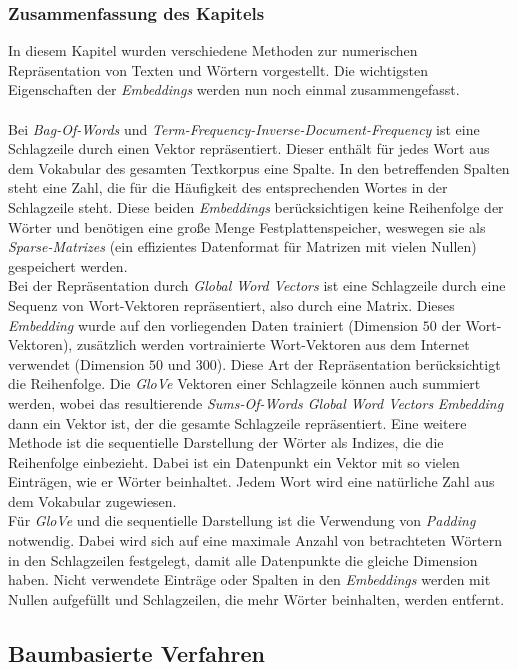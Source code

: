 \documentclass[a4paper,11pt]{article}
\begin{document}
\subsubsection{Zusammenfassung des Kapitels}

In diesem Kapitel wurden verschiedene Methoden zur numerischen Repräsentation von Texten und Wörtern vorgestellt. Die wichtigsten Eigenschaften der \textit{Embeddings} werden nun noch einmal zusammengefasst.\\
\\
Bei \textit{Bag-Of-Words} und \textit{Term-Frequency-Inverse-Document-Frequency} ist eine Schlagzeile durch einen Vektor repräsentiert. Dieser enthält für jedes Wort aus dem Vokabular des gesamten Textkorpus eine Spalte. In den betreffenden Spalten steht eine Zahl, die für die Häufigkeit des entsprechenden Wortes in der Schlagzeile steht. Diese beiden \textit{Embeddings} berücksichtigen keine Reihenfolge der Wörter und benötigen eine große Menge Festplattenspeicher, weswegen sie als \textit{Sparse-Matrizes} (ein effizientes Datenformat für Matrizen mit vielen Nullen) gespeichert werden.\\
Bei der Repräsentation durch \textit{Global Word Vectors} ist eine Schlagzeile durch eine Sequenz von Wort-Vektoren repräsentiert, also durch eine Matrix. Dieses \textit{Embedding} wurde auf den vorliegenden Daten trainiert (Dimension $50$ der Wort-Vektoren), zusätzlich werden vortrainierte Wort-Vektoren aus dem Internet verwendet (Dimension $50$ und $300$). Diese Art der Repräsentation berücksichtigt die Reihenfolge. Die \textit{GloVe} Vektoren einer Schlagzeile können auch summiert werden, wobei das resultierende \textit{Sums-Of-Words Global Word Vectors} \textit{Embedding} dann ein Vektor ist, der die gesamte Schlagzeile repräsentiert. Eine weitere Methode ist die sequentielle Darstellung der Wörter als Indizes, die die Reihenfolge einbezieht. Dabei ist ein Datenpunkt ein Vektor mit so vielen Einträgen, wie er Wörter beinhaltet. Jedem Wort wird eine natürliche Zahl aus dem Vokabular zugewiesen.\\
Für \textit{GloVe} und die sequentielle Darstellung ist die Verwendung von \textit{Padding} notwendig. Dabei wird sich auf eine maximale Anzahl von betrachteten Wörtern in den Schlagzeilen festgelegt, damit alle Datenpunkte die gleiche Dimension haben. Nicht verwendete Einträge oder Spalten in den \textit{Embeddings} werden mit Nullen aufgefüllt und Schlagzeilen, die mehr Wörter beinhalten, werden entfernt.


\subsection{Baumbasierte Verfahren}\label{kap:machineLearning}
\end{document}

